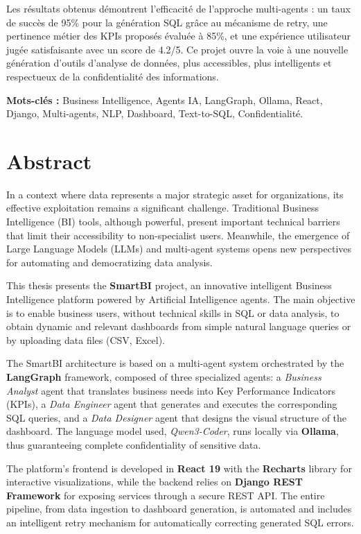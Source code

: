 \documentclass{rapportENSIAS}
\begin{document}
Les résultats obtenus démontrent l'efficacité de l'approche multi-agents : un taux de succès de 95\% pour la génération SQL grâce au mécanisme de retry, une pertinence métier des KPIs proposés évaluée à 85\%, et une expérience utilisateur jugée satisfaisante avec un score de 4.2/5. Ce projet ouvre la voie à une nouvelle génération d'outils d'analyse de données, plus accessibles, plus intelligents et respectueux de la confidentialité des informations.

\textbf{Mots-clés :} Business Intelligence, Agents IA, LangGraph, Ollama, React, Django, Multi-agents, NLP, Dashboard, Text-to-SQL, Confidentialité.

\chapter*{Abstract}

In a context where data represents a major strategic asset for organizations, its effective exploitation remains a significant challenge. Traditional Business Intelligence (BI) tools, although powerful, present important technical barriers that limit their accessibility to non-specialist users. Meanwhile, the emergence of Large Language Models (LLMs) and multi-agent systems opens new perspectives for automating and democratizing data analysis.

This thesis presents the \textbf{SmartBI} project, an innovative intelligent Business Intelligence platform powered by Artificial Intelligence agents. The main objective is to enable business users, without technical skills in SQL or data analysis, to obtain dynamic and relevant dashboards from simple natural language queries or by uploading data files (CSV, Excel).

The SmartBI architecture is based on a multi-agent system orchestrated by the \textbf{LangGraph} framework, composed of three specialized agents: a \textit{Business Analyst} agent that translates business needs into Key Performance Indicators (KPIs), a \textit{Data Engineer} agent that generates and executes the corresponding SQL queries, and a \textit{Data Designer} agent that designs the visual structure of the dashboard. The language model used, \textit{Qwen3-Coder}, runs locally via \textbf{Ollama}, thus guaranteeing complete confidentiality of sensitive data.

The platform's frontend is developed in \textbf{React 19} with the \textbf{Recharts} library for interactive visualizations, while the backend relies on \textbf{Django REST Framework} for exposing services through a secure REST API. The entire pipeline, from data ingestion to dashboard generation, is automated and includes an intelligent retry mechanism for automatically correcting generated SQL errors.
\end{document}
